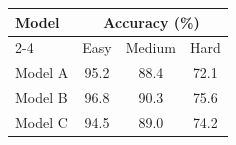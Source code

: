 \begin{table}[htbp]
\centering
\begin{tabular}{lccc}
\toprule
\multirow{2}{*}{Model} & \multicolumn{3}{c}{Accuracy (\%)} \\
\cmidrule(lr){2-4}
 & Easy & Medium & Hard \\
\midrule
Model A & 95.2 & 88.4 & 72.1 \\
Model B & 96.8 & 90.3 & 75.6 \\
Model C & 94.5 & 89.0 & 74.2 \\
\bottomrule
\end{tabular}
\end{table}
